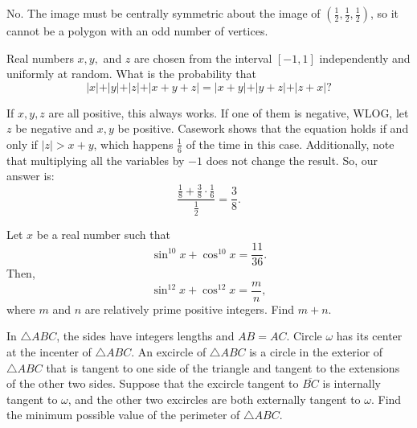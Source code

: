 \begin{solution}[name={Solution by CantonMathGuy}]
	No. The image must be centrally symmetric about the image of $(\tfrac{1}{2}, \tfrac{1}{2}, \tfrac{1}{2})$, so it cannot be a polygon with an odd number of vertices.
\end{solution}



\begin{question}[name={2018 HMMT, November General, \href{https://artofproblemsolving.com/community/c129h1590292p9853489}{Problem 10}}]
	Real numbers $x,y,$ and $z$ are chosen from the interval $[-1,1]$ independently and uniformly at random. What is the probability that$$\vert{x}\vert+\vert{y}\vert+\vert{z}\vert+\vert{x+y+z}\vert=\vert{x+y}\vert+\vert{y+z}\vert+\vert{z+x}\vert?$$
\end{question}




\begin{solution}[name={Solution by iNomOnCountdown}]
	If $x, y, z$ are all positive, this always works. If one of them is negative, WLOG, let $z$ be negative and $x, y$ be positive. Casework shows that the equation holds if and only if $|z| > x+y$, which happens $\frac{1}{6}$ of the time in this case. Additionally, note that multiplying all the variables by $-1$ does not change the result. So, our answer is:
	$$\frac{\frac{1}{8} + \frac{3}{8} \cdot \frac{1}{6}}{\frac{1}{2}} = \boxed{\frac{3}{8}}.$$
\end{solution}





\begin{question}[name={2019 AIME I, \href{https://artofproblemsolving.com/community/c4p11972735}{Problem 8}}]
	Let $x$ be a real number such that $$\sin^{10}x+\cos^{10} x = \frac{11}{36}.$$ Then, $$\sin^{12}x+\cos^{12} x = \frac{m}{n},$$ where $m$ and $n$ are relatively prime positive integers. Find $m+n$.	
\end{question}


%	












\begin{question}[name={2019 AIME I, \href{https://artofproblemsolving.com/community/c4p11972878}{Problem 11}}]
	In $\triangle ABC$, the sides have integers lengths and $AB=AC$. Circle $\omega$ has its center at the incenter of $\triangle ABC$. An excircle of $\triangle ABC$ is a circle in the exterior of $\triangle ABC$ that is tangent to one side of the triangle and tangent to the extensions of the other two sides. Suppose that the excircle tangent to $\overline{BC}$ is internally tangent to $\omega$, and the other two excircles are both externally tangent to $\omega$. Find the minimum possible value of the perimeter of $\triangle ABC$.
\end{question}


